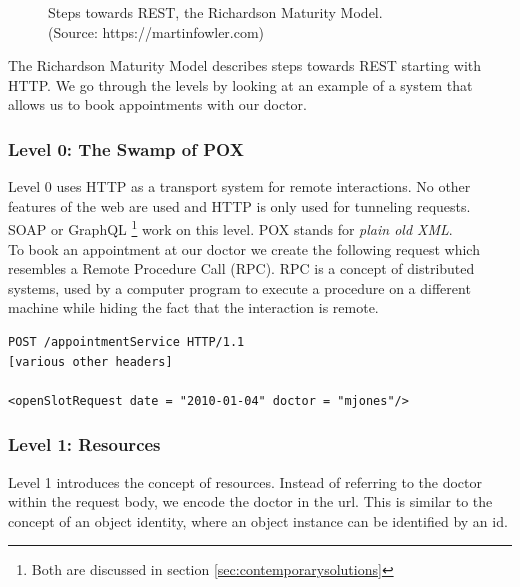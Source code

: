 \begin{figure}[!htb]
  \caption{Steps towards REST, the Richardson Maturity Model. \\ (Source: https://martinfowler.com)}
\end{figure}

The Richardson Maturity Model describes steps towards REST starting with HTTP. We go through the levels by looking at an example of a system that allows us to book appointments with our doctor.

\subsubsection{Level 0: The Swamp of POX}
Level 0 uses HTTP as a transport system for remote interactions. No other features of the web are used and HTTP is only used for tunneling requests. SOAP or GraphQL \footnote{Both are discussed in section \ref{sec:contemporarysolutions}} work on this level. POX stands for \textit{plain old XML}. \\
To book an appointment at our doctor we create the following request which resembles a Remote Procedure Call (RPC). RPC is a concept of distributed systems, used by a computer program to execute a procedure on a different machine while hiding the fact that the interaction is remote.

\lstset{language=XML}
\begin{lstlisting}[caption=Level 0: Remote procedure call on HTTP. \citep{richardsonmaturitymodel}]
POST /appointmentService HTTP/1.1
[various other headers]

<openSlotRequest date = "2010-01-04" doctor = "mjones"/>
\end{lstlisting}

\subsubsection{Level 1: Resources}
Level 1 introduces the concept of resources. Instead of referring to the doctor within the request body, we encode the doctor in the \gls{url}. This is similar to the concept of an object identity, where an object instance can be identified by an id.

